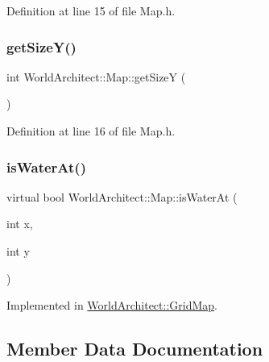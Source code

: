 Definition at line 15 of file Map.\+h.

\mbox{\label{class_world_architect_1_1_map_ae26053131c967d9732e64f27c0765c65}} 
\subsubsection{\texorpdfstring{getSizeY()}{getSizeY()}}
{\footnotesize\ttfamily int World\+Architect\+::\+Map\+::get\+SizeY (\begin{DoxyParamCaption}{ }\end{DoxyParamCaption})\hspace{0.3cm}{\ttfamily [inline]}}



Definition at line 16 of file Map.\+h.

\mbox{\label{class_world_architect_1_1_map_a9bc642e73c611d59d5185c7973c8bd09}} 
\subsubsection{\texorpdfstring{isWaterAt()}{isWaterAt()}}
{\footnotesize\ttfamily virtual bool World\+Architect\+::\+Map\+::is\+Water\+At (\begin{DoxyParamCaption}\item[{int}]{x,  }\item[{int}]{y }\end{DoxyParamCaption})\hspace{0.3cm}{\ttfamily [pure virtual]}}



Implemented in \mbox{\hyperlink{class_world_architect_1_1_grid_map_ae4562a4b2e6db010954854d64d1c5103}{World\+Architect\+::\+Grid\+Map}}.



\subsection{Member Data Documentation}
\mbox{\label{class_world_architect_1_1_map_a1b4cf9200dca11577b4567584a1e62b8}} 
